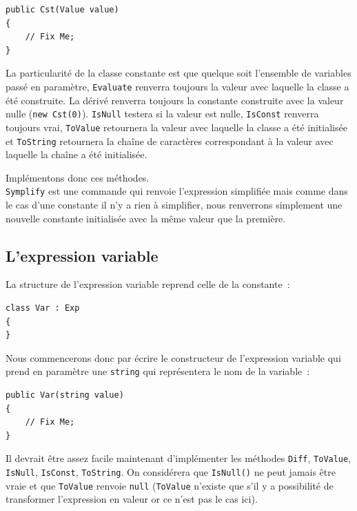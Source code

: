 \documentclass[12pt,a4paper]{report}
\begin{document}
\begin{lstlisting}
public Cst(Value value)
{
	// Fix Me;
}
\end{lstlisting}


La particularité de la classe constante est que quelque soit
l'ensemble de variables passé en paramètre, \texttt{Evaluate} renverra
toujours la valeur avec laquelle la classe a été construite. La dérivé
renverra toujours la constante construite avec la valeur nulle
(\texttt{new
Cst(0)}). \texttt{IsNull} testera si la valeur est nulle,
\texttt{IsConst} renverra toujours vrai, \texttt{ToValue} retournera
la valeur avec laquelle la classe a été initialisée et
\texttt{ToString} retournera la chaîne de caractères correspondant à
la valeur avec laquelle la chaîne a été initialisée.

Implémentons donc ces méthodes.\\

\texttt{Symplify} est une commande qui renvoie l'expression simplifiée
mais comme dans le cas d'une constante il n'y a rien à simplifier,
nous renverrons simplement une nouvelle constante initialisée avec la
même valeur que la première.

\subsection{L'expression variable}

La structure de l'expression variable reprend celle de la constante~:

\begin{lstlisting}
class Var : Exp
{
}
\end{lstlisting}

Nous commencerons donc par écrire le constructeur de l'expression variable qui prend en paramètre une \texttt{string} qui représentera le nom de la variable~:

\begin{lstlisting}
public Var(string value)
{
	// Fix Me;
}
\end{lstlisting}


Il devrait être assez facile maintenant d'implémenter les méthodes
\texttt{Diff}, \texttt{ToValue}, \texttt{IsNull}, \texttt{IsConst},
\texttt{ToString}. On considérera que \texttt{IsNull()} ne peut jamais
être vraie et que \texttt{ToValue} renvoie \texttt{null}
(\texttt{ToValue} n'existe que s'il y a possibilité de transformer
l'expression en valeur or ce n'est pas le cas ici).\\
\end{document}
